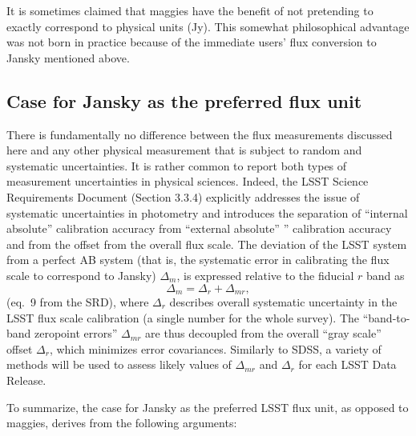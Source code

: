 \documentclass{emulateapj}
\begin{document}
It is sometimes claimed that maggies have the benefit of not pretending 
to exactly correspond to physical units (Jy). This somewhat philosophical
advantage was not born in practice because of the immediate users' 
flux conversion to Jansky mentioned above. 


\subsection{Case for Jansky as the preferred flux unit} 

There is fundamentally no difference between the flux measurements discussed
here and any other physical measurement that is subject to random and systematic
uncertainties. It is rather common to report both types of measurement uncertainties
in physical sciences. Indeed, the LSST  Science Requirements Document (Section 3.3.4)
explicitly addresses the issue of systematic uncertainties in photometry and
introduces the separation of ``internal absolute'' calibration accuracy 
from ``external absolute'' ” calibration accuracy and from the offset from the
overall flux scale. The deviation of the LSST system from a perfect AB system
(that is, the systematic error in calibrating the flux scale to correspond to Jansky)  
$\Delta_m$, is expressed relative to the fiducial $r$ band as 
\begin{equation}
             \Delta_m = \Delta_r + \Delta_{mr}, 
\end{equation}
(eq.~9 from the SRD), where $\Delta_r$ describes overall systematic uncertainty 
in the LSST flux scale calibration (a single number for the whole survey). The 
``band-to-band zeropoint errors'' $\Delta_{mr}$ are thus decoupled from the overall 
``gray scale'' offset $\Delta_{r}$, which minimizes error covariances. Similarly to SDSS, 
a variety of methods will be used to assess likely values of $\Delta_{mr}$ and 
$\Delta_r$ for each LSST Data Release. 

To summarize, the case for Jansky as the preferred LSST flux unit, as opposed
to maggies, derives from the following arguments: 
\end{document}
